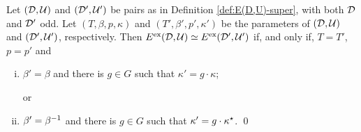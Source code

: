 \begin{thm}\label{thm:iso-D-odd-ExEsop}
    Let $(\mathcal{D}, \mathcal U)$ and $(\mathcal{D}', \mathcal U')$ be pairs as in Definition \ref{def:E(D,U)-super}, with both $\mathcal{D}$ and $\mathcal{D}'$ odd. 
    Let $(T, \beta, p, \kappa)$ and $(T', \beta', p', \kappa')$ be the parameters of $(\mathcal{D}, \mathcal U)$ and $(\mathcal{D}', \mathcal U')$, respectively. 
	Then $E^{\mathrm{ex}}(\mathcal{D}, \mathcal U) \simeq E^{\mathrm{ex}}(\mathcal{D}', \mathcal U')$ if, and only if, $T=T'$, $p = p'$ and
	\begin{enumerate}[(i)]
	    \item $\beta'=\beta$ and there is $g\in G$ such that $\kappa' = g \cdot \kappa$;
	    
	    or
	    \item $\beta'=\beta^{-1}$ and there is $g\in G$ such that $\kappa' = g \cdot \kappa^\star$. \qed
	\end{enumerate}
\end{thm}
